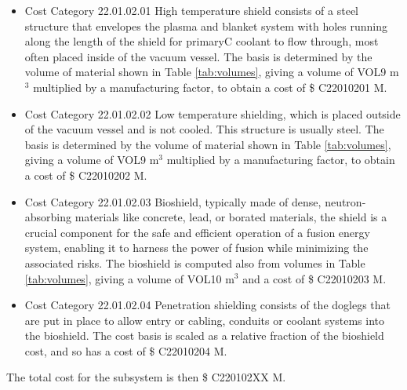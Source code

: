 \begin{itemize}
    \item Cost Category 22.01.02.01 High temperature shield consists of a steel structure that envelopes the plasma and blanket system with holes running along the length of the shield for primaryC coolant to flow through, most often placed inside of the vacuum vessel. The basis is determined by the volume of material shown in Table \ref{tab:volumes}, giving a volume of VOL9  m$^{3}$ multiplied by a manufacturing factor, to obtain a cost of \$ C22010201 M. %
    \item Cost Category 22.01.02.02 Low temperature shielding, which is placed outside of the vacuum vessel and is not cooled.  This structure is usually steel.  The basis is determined by the volume of material shown in Table \ref{tab:volumes}, giving a volume of VOL9 m$^{3}$ multiplied by a manufacturing factor, to obtain a cost of \$ C22010202 M.
    \item Cost Category 22.01.02.03 Bioshield, typically made of dense, neutron-absorbing materials like concrete, lead, or borated materials, the shield is a crucial component for the safe and efficient operation of a fusion energy system, enabling it to harness the power of fusion while minimizing the associated risks.  The bioshield is computed also from volumes in Table \ref{tab:volumes}, giving a volume of VOL10 m$^{3}$ and a cost of \$ C22010203 M. 
    \item Cost Category 22.01.02.04 Penetration shielding consists of the doglegs that are put in place to allow entry or cabling, conduits or coolant systems into the bioshield.  The cost basis is scaled as a relative fraction of the bioshield cost, and so has a cost of \$ C22010204 M.
\end{itemize}

The total cost for the subsystem is then \$ C220102XX M.




